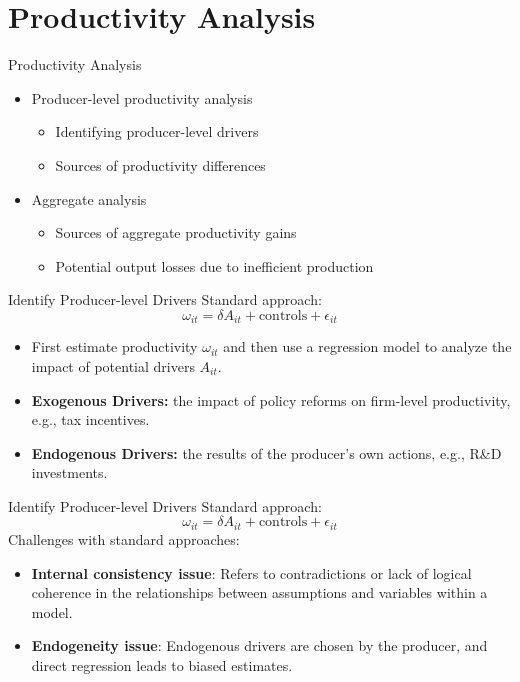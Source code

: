 \documentclass[aspectratio=169]{beamer}  %
\begin{document}
\section{Productivity Analysis}
\begin{frame}{Productivity Analysis}
    \begin{itemize}
        \item Producer-level productivity analysis
        \begin{itemize}
            \item Identifying producer-level drivers
            \item Sources of productivity differences
        \end{itemize}
        \item Aggregate analysis
        \begin{itemize}
            \item Sources of aggregate productivity gains
            \item Potential output losses due to inefficient production
        \end{itemize}
    \end{itemize}
\end{frame}

\begin{frame}{Identify Producer-level Drivers}
    Standard approach:
    \[
    \omega_{it} = \delta A_{it} + \text{controls} + \epsilon_{it}
    \]
    \begin{itemize}
        \item First estimate productivity \(\omega_{it}\) and then use a regression model to analyze the impact of potential drivers \(A_{it}\).
        \item \textbf{Exogenous Drivers:} the impact of policy reforms on firm-level productivity, e.g., tax incentives.
        \item \textbf{Endogenous Drivers:} the results of the producer's own actions, e.g., R\&D investments.
    \end{itemize}
\end{frame}

\begin{frame}{Identify Producer-level Drivers}
    Standard approach:
    \[
    \omega_{it} = \delta A_{it} + \text{controls} + \epsilon_{it}
    \]
    Challenges with standard approaches:
    \begin{itemize}
        \item \textbf{Internal consistency issue}: Refers to contradictions or lack of logical coherence in the relationships between assumptions and variables within a model.
        \item \textbf{Endogeneity issue}: Endogenous drivers are chosen by the producer, and direct regression leads to biased estimates.
    \end{itemize}
\end{frame}
\end{document}
